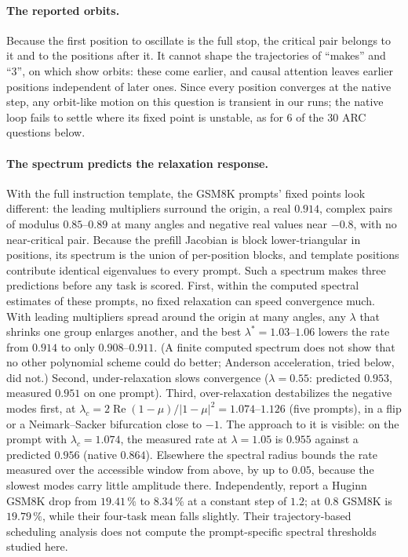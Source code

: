 \documentclass[11pt,letterpaper]{article}
\begin{document}
\paragraph{The reported orbits.} Because the first position to oscillate is the full stop, the critical pair belongs
to it and to the positions after it. It cannot shape the trajectories of ``makes'' and ``3'', on which
\citet{geiping2025recurrent} show orbits: these come earlier, and causal attention leaves earlier positions
independent of later ones. Since every position converges at the native step, any orbit-like motion on this question
is transient in our runs; the native loop fails to settle where its fixed point is unstable, as for 6 of the 30 ARC
questions below.

\paragraph{The spectrum predicts the relaxation response.} With the full instruction template, the GSM8K prompts'
fixed points look different: the leading multipliers surround the origin, a real $0.914$, complex pairs of modulus
$0.85$--$0.89$ at many angles and negative real values near $-0.8$, with no near-critical pair. Because the prefill
Jacobian is block lower-triangular in positions, its spectrum is the union of per-position blocks, and template
positions contribute identical eigenvalues to every prompt. Such a spectrum makes three predictions before any task is
scored. First, within the computed spectral estimates of these prompts, no fixed relaxation can speed convergence
much. With leading multipliers spread around the origin at many angles, any $\lambda$ that shrinks one group enlarges
another, and the best $\lambda^*=1.03$--$1.06$ lowers the rate from $0.914$ to only $0.908$--$0.911$. (A finite
computed spectrum does not show that no other polynomial scheme could do better; Anderson acceleration, tried below,
did not.) Second, under-relaxation slows convergence ($\lambda=0.55$: predicted $0.953$, measured $0.951$ on one
prompt). Third, over-relaxation destabilizes the negative modes first, at
$\lambda_c=2\operatorname{Re}(1-\mu)/|1-\mu|^2=1.074$--$1.126$ (five prompts), in a flip or a Neimark--Sacker
bifurcation close to $-1$. The approach to it is visible: on the prompt with $\lambda_c=1.074$, the measured rate at
$\lambda=1.05$ is $0.955$ against a predicted $0.956$ (native $0.864$). Elsewhere the spectral radius bounds the rate
measured over the accessible window from above, by up to $0.05$, because the slowest modes carry little amplitude
there. Independently, \citet{wang2026taps} report a Huginn GSM8K drop from $19.41\,\%$ to
$8.34\,\%$ at a constant step of $1.2$; at $0.8$ GSM8K is $19.79\,\%$, while their four-task mean falls slightly.
Their trajectory-based scheduling analysis does not compute the prompt-specific spectral thresholds studied here.
\end{document}
